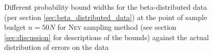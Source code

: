 \begin{figure}[]
	\caption{Different probability bound widths for the beta-distributed data (per section \ref{sec:beta_distributed_data}) at the point of sample budget $n=50N$ for \textsc{Ney} sampling method (see section \ref{sec:discussion} for descriptions of the bounds) against the actual distribution of errors on the data}
	\label{fig:bounds_widths}
\end{figure}
